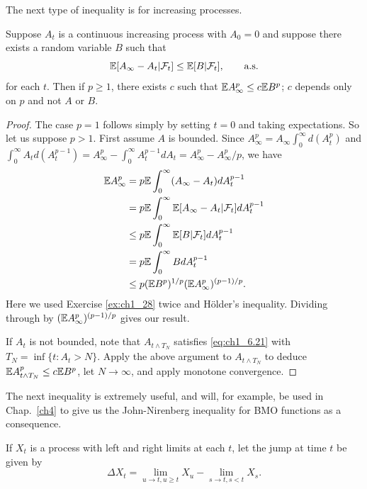 
The next type of inequality is for increasing processes.

\begin{theorem}\label{thm:ch1_6.10}
Suppose $A_t$ is a continuous increasing process with $A_0 = 0$ and suppose there exists a random variable $B$ such that
\begin{equation}\label{eq:ch1_6.21}
    \mathbb{E}[A_\infty - A_t| \mathcal{F}_t] \leq \mathbb{E}[B| \mathcal{F}_t], \qquad \textnormal{a.s.}
\end{equation}
for each $t$. Then if $p \geq 1$, there exists $c$ such that $\mathbb{E} A_\infty^p \leq c\mathbb{E} B^p$; $c$ depends only on $p$ and not $A$ or $B$.
\end{theorem}

\begin{proof}
The case $p = 1$ follows simply by setting $t = 0$ and taking expectations. So let us suppose $p > 1$. First assume $A$ is bounded. Since $A_\infty^p =A_\infty \int_0^\infty d(A_t^p)$ and $\int_0^\infty A_td(A_t^{p-1}) = A_\infty^p - \int_0^\infty A_t^{p-1}dA_t = A_\infty^p - A_\infty^p/p$, we have
\begin{align*}
    \mathbb{E} A_\infty^p &= p\mathbb{E} \int_0^\infty (A_\infty - A_t)dA_t^{p-1} \\
    &= p\mathbb{E} \int_0^\infty \mathbb{E}[A_\infty - A_t| \mathcal{F}_t]dA_t^{p-1} \\
    &\leq p\mathbb{E} \int_0^\infty \mathbb{E}[B| \mathcal{F}_t]dA_t^{p-1} \\
    &= p\mathbb{E} \int_0^\infty BdA_t^{p-1} \\
    &\leq p(\mathbb{E} B^p)^{1/p}(\mathbb{E} A_\infty^p)^{(p-1)/p}.
\end{align*}
Here we used Exercise \ref{ex:ch1_28} twice and H\"older's inequality. Dividing through by $(\mathbb{E} A_\infty^p)^{(p-1)/p}$ gives our result.

If $A_t$ is not bounded, note that $A_{t\wedge T_N}$ satisfies \eqref{eq:ch1_6.21} with $T_N = \inf\{t : A_t > N\}$. Apply the above argument to $A_{t\wedge T_N}$ to deduce $\mathbb{E} A_{t\wedge T_N}^p \leq c\mathbb{E} B^p$, let $N \to \infty$, and apply monotone convergence.
\end{proof}


The next inequality is extremely useful, and will, for example, be used in Chap.\ \ref{ch4} to give us the John-Nirenberg inequality for BMO functions as a consequence.

If $X_t$ is a process with left and right limits at each $t$, let the jump at time $t$ be given by
\[
    \Delta X_t = \lim_{u\to t,u\geq t} X_u - \lim_{s\to t,s<t} X_s.
\]


